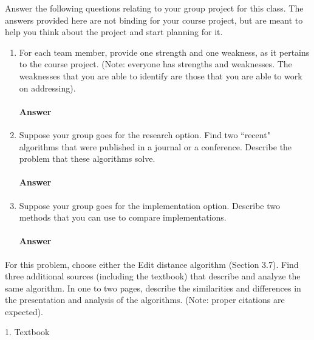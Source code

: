 \documentclass{article}
\begin{document}
Answer the following questions relating to your group project for this class.
The answers provided here are not binding for your course project, but are meant
to help you think about the project and start planning for it.

\begin{enumerate}

    \item For each team member, provide one strength and one weakness, as it
        pertains to the course project.  (Note: everyone has strengths and
        weaknesses.  The weaknesses that you are able to identify are those that
        you are able to work on addressing).

        \paragraph{Answer}
        \todo{}

    \item Suppose your group goes for the research option.  Find two ``recent"
        algorithms that were published in a journal or a conference.  Describe
        the problem that these algorithms solve.

        \paragraph{Answer}
        \todo{}

    \item Suppose your group goes for the implementation option. Describe two
        methods that you can use to compare implementations.

        \paragraph{Answer}
        \todo{}

\end{enumerate}


\collab{\todo{}}

For this problem, choose either the Edit distance algorithm (Section 3.7).
Find three additional sources (including the textbook) that describe
and analyze the same algorithm. In one to two pages, describe the similarities
and differences in the presentation and analysis of the algorithms. (Note:
proper citations are expected).

1. Textbook
\end{document}
